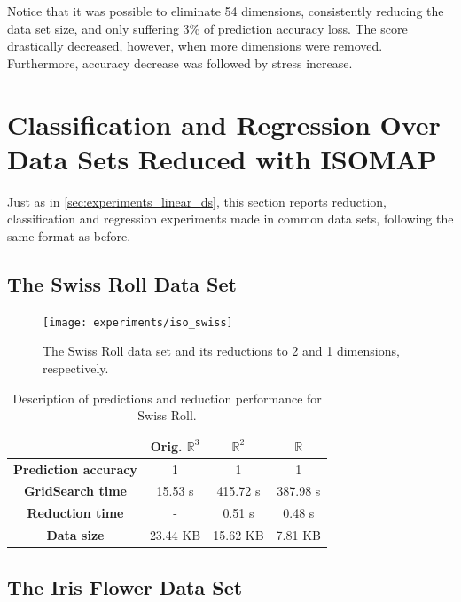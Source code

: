 Notice that it was possible to eliminate 54 dimensions, consistently reducing the data set size, and only suffering 3\% of prediction accuracy loss. The score drastically decreased, however, when more dimensions were removed. Furthermore, accuracy decrease was followed by stress increase.

\section{Classification and Regression Over Data Sets Reduced with ISOMAP}

Just as in \ref{sec:experiments_linear_ds}, this section reports reduction, classification and regression experiments made in common data sets, following the same format as before.

\subsection{The Swiss Roll Data Set}

\begin{figure}[H]
	\centering
	\texttt{[image: experiments/iso\_swiss]}
	\captionsetup{justification=centering}
	\caption{The Swiss Roll data set and its reductions to 2 and 1 dimensions, respectively.}
\end{figure}

\begin{table}[H]
	\centering
	\begin{tabular}{|c|c|c|c|}
		\hline
		& \textbf{Orig. $\mathbb{R}^3$} & \textbf{$\mathbb{R}^2$} & \textbf{$\mathbb{R}$} \\\hline
		\textbf{Prediction accuracy}   & 1            & 1             & 1     \\\hline
		\textbf{GridSearch time} & 15.53 s   & 415.72 s  & 387.98 s  \\\hline
		\textbf{Reduction time}  & -         & 0.51 s       & 0.48 s     \\\hline
		\textbf{Data size}          & 23.44 KB & 15.62 KB  & 7.81 KB   \\\hline
	\end{tabular}
	
	\caption{Description of predictions and reduction performance for Swiss Roll.}
\end{table}

\subsection{The Iris Flower Data Set}


